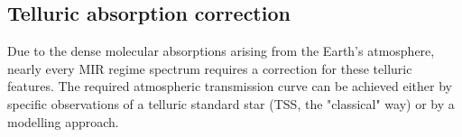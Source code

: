 
\subsection{Telluric absorption correction}\label{ssec:tellcorr}
Due to the dense molecular absorptions arising from the Earth's atmosphere, nearly every \ac{MIR} regime spectrum requires a correction for these telluric features. The required atmospheric transmission curve can be achieved either by specific observations of a telluric standard star (\ac{TSS}, the "classical" way) or by a modelling approach. \\
